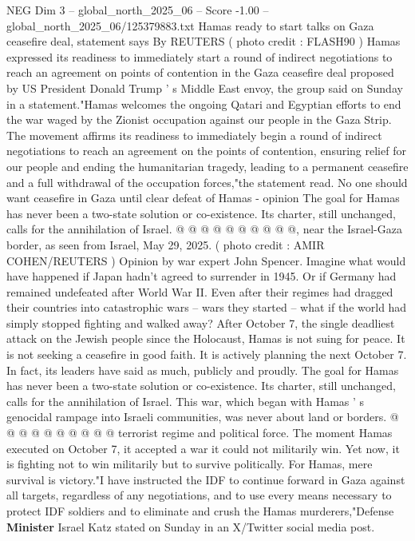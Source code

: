 \begin{textsample}{NEG Dim 3 – global\_north\_2025\_06 – Score -1.00 – global\_north\_2025\_06/125379883.txt}  \label{ex:f3_neg_350}
Hamas ready to start talks on Gaza ceasefire deal, statement says By REUTERS ( photo credit : FLASH90 ) Hamas expressed its readiness to immediately start a round of indirect negotiations to reach an agreement on points of contention in the Gaza ceasefire deal proposed by US President Donald Trump ' s Middle East envoy, the group said on Sunday in a statement."Hamas welcomes the ongoing Qatari and Egyptian efforts to end the war waged by the Zionist occupation against our people in the Gaza Strip.
The movement affirms its readiness to immediately begin a round of indirect negotiations to reach an agreement on the points of contention, ensuring relief for our people and ending the humanitarian tragedy, leading to a permanent ceasefire and a full withdrawal of the occupation forces,"the statement read.
No one should want ceasefire in Gaza until clear defeat of Hamas - opinion The goal for Hamas has never been a two-state solution or co-existence.
Its charter, still unchanged, calls for the annihilation of Israel. @ @ @ @ @ @ @ @ @ @, near the Israel-Gaza border, as seen from Israel, May 29, 2025. ( photo credit : AMIR COHEN/REUTERS ) Opinion by war expert John Spencer.
Imagine what would have happened if Japan hadn't agreed to surrender in 1945.
Or if Germany had remained undefeated after World War II.
Even after their regimes had dragged their countries into catastrophic wars -- wars they started -- what if the world had simply stopped fighting and walked away?
After October 7, the single deadliest attack on the Jewish people since the Holocaust, Hamas is not suing for peace.
It is not seeking a ceasefire in good faith.
It is actively planning the next October 7.
In fact, its leaders have said as much, publicly and proudly.
The goal for Hamas has never been a two-state solution or co-existence.
Its charter, still unchanged, calls for the annihilation of Israel.
This war, which began with Hamas ' s genocidal rampage into Israeli communities, was never about land or borders. @ @ @ @ @ @ @ @ @ @ terrorist regime and political force.
The moment Hamas executed on October 7, it accepted a war it could not militarily win.
Yet now, it is fighting not to win militarily but to survive politically.
For Hamas, mere survival is victory."I have instructed the IDF to continue forward in Gaza against all targets, regardless of any negotiations, and to use every means necessary to protect IDF soldiers and to eliminate and crush the Hamas murderers,"Defense \textbf{Minister} Israel Katz stated on Sunday in an X/Twitter social media post.

\end{textsample}
